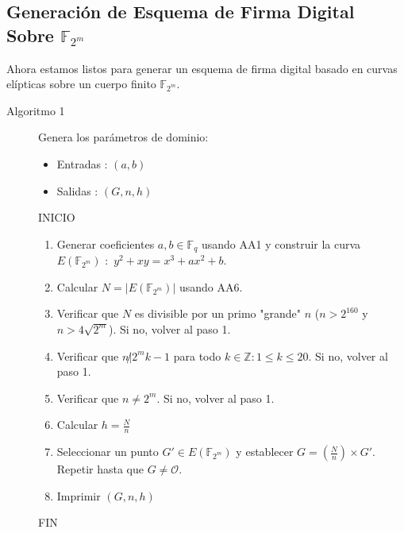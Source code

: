 \documentclass[11pt]{article}
\newcommand{\Z}{\mathbb{Z}}
\newcommand{\F}{\mathbb{F}}
\newcommand{\Fq}{\mathbb{F}_q}
\newcommand{\Fm}{\F_{2^m}}
\numberwithin{equation}{section} %
\numberwithin{figure}{section} %
\numberwithin{table}{section} %
\begin{document}
	\subsection{Generación de Esquema de Firma Digital Sobre $\F_{2^m}$}
	\label{AP}

		Ahora estamos listos para generar un esquema de firma digital basado en curvas elípticas sobre un cuerpo finito $\Fm$.

		\begin{description}%
		
		
			\item[Algoritmo 1] Genera los parámetros de dominio:%
			\begin{itemize}
				\item Entradas : $(a,b)$
				\item Salidas : $(G,n,h)$
			\end{itemize}
			INICIO
			\begin{enumerate}
				\item Generar coeficientes $a,b\in\Fq$ usando AA1 y construir la curva $E(\Fm)$ $:$ $y^2+xy=x^3+ax^2+b$.
				\item Calcular $N=|E(\Fm)|$ usando AA6.
				\item Verificar que $N$ es divisible por un primo "grande" $n$  ($n>2^{160}$ y $n>4\sqrt{2^m}$). Si no, volver al paso 1.
				\item Verificar que $n \not|2^mk-1$ para todo $k\in\Z : 1\leq k\leq 20$. Si no, volver al paso 1.
				\item Verificar que $n\neq 2^m$. Si no, volver al paso 1.
				\item Calcular $h=\frac{N}{n}$
				\item Seleccionar un punto $G\prime\in E(\Fm)$ y establecer $G=\left(\frac{N}{n}\right)\times G\prime$. Repetir hasta que $G\neq \mathcal{O}$.
				\item Imprimir $(G,n,h)$
			\end{enumerate}
			FIN


\end{description}
\end{document}
